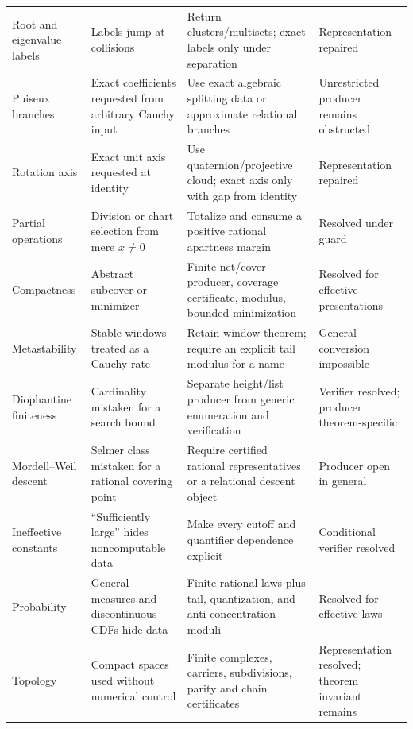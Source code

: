 \begin{longtable}{@{}p{}p{}p{}p{}@{}}
Root and eigenvalue labels & Labels jump at collisions &
Return clusters/multisets; exact labels only under separation &
Representation repaired \\

Puiseux branches & Exact coefficients requested from arbitrary Cauchy input &
Use exact algebraic splitting data or approximate relational branches &
Unrestricted producer remains obstructed \\

Rotation axis & Exact unit axis requested at identity &
Use quaternion/projective cloud; exact axis only with gap from identity &
Representation repaired \\

Partial operations & Division or chart selection from mere \(x\ne0\) &
Totalize and consume a positive rational apartness margin &
Resolved under guard \\

Compactness & Abstract subcover or minimizer &
Finite net/cover producer, coverage certificate, modulus, bounded minimization &
Resolved for effective presentations \\

Metastability & Stable windows treated as a Cauchy rate &
Retain window theorem; require an explicit tail modulus for a name &
General conversion impossible \\

Diophantine finiteness & Cardinality mistaken for a search bound &
Separate height/list producer from generic enumeration and verification &
Verifier resolved; producer theorem-specific \\

Mordell--Weil descent & Selmer class mistaken for a rational covering point &
Require certified rational representatives or a relational descent object &
Producer open in general \\

Ineffective constants & ``Sufficiently large'' hides noncomputable data &
Make every cutoff and quantifier dependence explicit &
Conditional verifier resolved \\

Probability & General measures and discontinuous CDFs hide data &
Finite rational laws plus tail, quantization, and anti-concentration moduli &
Resolved for effective laws \\

Topology & Compact spaces used without numerical control &
Finite complexes, carriers, subdivisions, parity and chain certificates &
Representation resolved; theorem invariant remains \\


\end{longtable}
